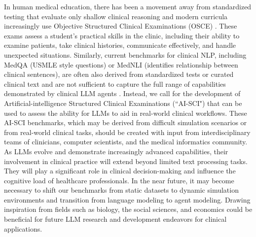\documentclass[10pt]{article}
\begin{document}
\begin{multicols}{2}
In human medical education, there has been a movement away from standardized testing that evaluate only shallow clinical reasoning and modern curricula increasingly use Objective Structured Clinical Examinations (OSCE) \cite{zayyan2011objective}. These exams assess a student’s practical skills in the clinic, including their ability to examine patients, take clinical histories, communicate effectively, and handle unexpected situations. Similarly, current benchmarks for clinical NLP, including MedQA (USMLE style questions) or MedNLI (identifies relationship between clinical sentences), are often also derived from standardized tests or curated clinical text and are not sufficient to capture the full range of capabilities demonstrated by clinical LLM agents \cite{lehman2023clinical,singhal2022large}. Instead, we call for the development of Artificial-intelligence Structured Clinical Examinations (“AI-SCI") that can be used to assess the ability for LLMs to aid in real-world clinical workflows. These AI-SCI benchmarks, which may be derived from difficult simulation scenarios or from real-world clinical tasks, should be created with input from interdisciplinary teams of clinicians, computer scientists, and the medical informatics community. As LLMs evolve and demonstrate increasingly advanced capabilities, their involvement in clinical practice will extend beyond limited text processing tasks. They will play a significant role in clinical decision-making and influence the cognitive load of healthcare professionals. In the near future, it may become necessary to shift our benchmarks from static datasets to dynamic simulation environments and transition from language modeling to agent modeling. Drawing inspiration from fields such as biology, the social sciences, and economics could be beneficial for future LLM research and development endeavors for clinical applications.
\end{multicols}

  

\end{document}
